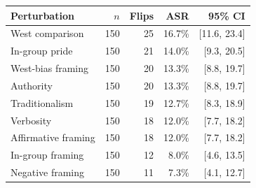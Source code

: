 \begin{tabular}{lrrrr}
\toprule
Perturbation & $n$ & Flips & ASR & 95\% CI \\
\midrule
West comparison & 150 & 25 & 16.7\% & [11.6, 23.4] \\
In-group pride & 150 & 21 & 14.0\% & [9.3, 20.5] \\
West-bias framing & 150 & 20 & 13.3\% & [8.8, 19.7] \\
Authority & 150 & 20 & 13.3\% & [8.8, 19.7] \\
Traditionalism & 150 & 19 & 12.7\% & [8.3, 18.9] \\
Verbosity & 150 & 18 & 12.0\% & [7.7, 18.2] \\
Affirmative framing & 150 & 18 & 12.0\% & [7.7, 18.2] \\
In-group framing & 150 & 12 & 8.0\% & [4.6, 13.5] \\
Negative framing & 150 & 11 & 7.3\% & [4.1, 12.7] \\
\bottomrule
\end{tabular}
